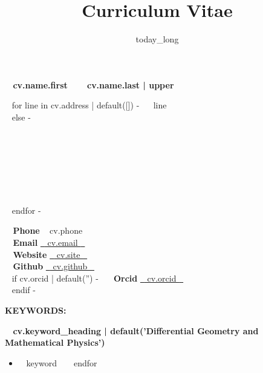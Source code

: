 \documentclass[a4paper]{article}
\title{Curriculum Vitae}
\author{\vspace{-1em}}
\date{~{{ today_long }}~}
\newcommand{\skill}[2]{\textbf{#1} \hfill #2 \\}
\begin{document}
\maketitle

	\vfill

	\begin{tcolorbox}
		\begin{center}
			\huge \textbf{~{{ cv.name.first }}~ ~{{ cv.name.last | upper }}~}
		\end{center}
		\vspace{1em}

		\begin{minipage}[t]{0.45\columnwidth}
~{ for line in cv.address | default([]) -}~
            ~{{ line }}~\\
~{ else -}~
            \strut\\
            \strut\\
            \strut\\
            \strut\\
~{ endfor -}~
		\end{minipage}
		\hfill
		\begin{minipage}[t]{0.45\columnwidth}
			\skill{\faPhone~ Phone}{~{{ cv.phone }}~}
			\skill{\faEnvelope~ Email}{\href{mailto:~{{ cv.email }}~}{~{{ cv.email }}~}}
			\skill{\faGlobe~ Website}{\href{~{{ cv.site }}~}{~{{ cv.site }}~}}
			\skill{\faGithubSquare ~ Github}{\href{https://github.com/~{{ cv.github }}~}{~{{ cv.github }}~}}
~{ if cv.orcid | default('') -}~
			\skill{~ Orcid}{\href{https://orcid.org/~{{ cv.orcid }}~}{~{{ cv.orcid }}~}}
~{ endif -}~
		\end{minipage}
	\end{tcolorbox}

	\vfill

	\begin{tcolorbox}
		\begin{minipage}[t]{0.2\columnwidth}
			\textbf{KEYWORDS:}
		\end{minipage}
		\hfill
		\begin{minipage}[t]{0.75\columnwidth}
			\textbf{~{{ cv.keyword_heading | default('Differential Geometry and Mathematical Physics') }}~}
		\begin{itemize}[leftmargin=*, itemsep=0pt, parsep=0pt, topsep=0pt, partopsep=0pt]
~{ for keyword in cv.keywords -}~
			\item[$\cdot$] ~{{ keyword }}~
~{ endfor }~
		\end{itemize}
		\end{minipage}
	\end{tcolorbox}
\end{document}
